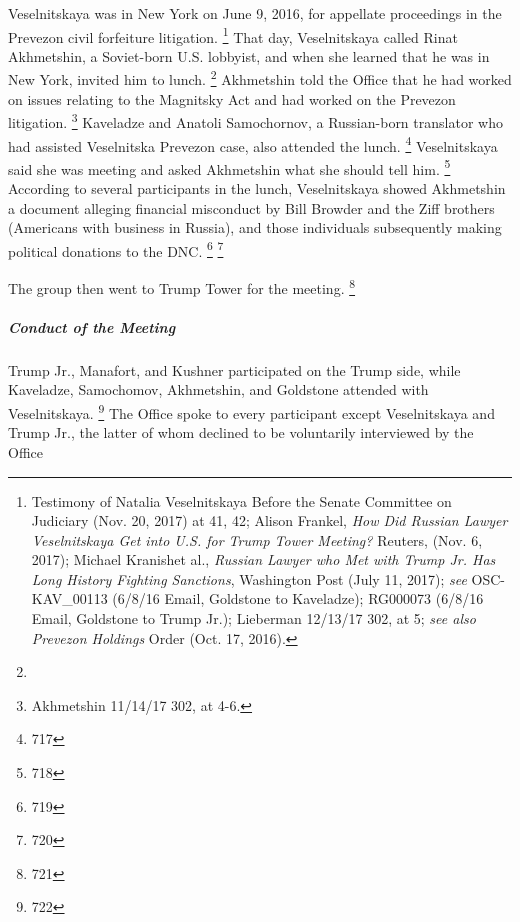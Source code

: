 Veselnitskaya was in New York on June 9, 2016, for appellate proceedings in the Prevezon civil forfeiture litigation.%
\footnote{Testimony of Natalia Veselnitskaya Before the Senate Committee on Judiciary (Nov. 20, 2017) at 41, 42; 
Alison Frankel, \textit{How Did Russian Lawyer Veselnitskaya Get into U.S. for Trump Tower Meeting?} Reuters, (Nov. 6, 2017); 
Michael Kranishet al., \textit{Russian Lawyer who Met with Trump Jr. Has Long History Fighting Sanctions}, Washington Post (July 11, 2017); 
\textit{see} OSC-KAV\_00113 (6/8/16 Email, Goldstone to Kaveladze); 
RG000073 (6/8/16 Email, Goldstone to Trump Jr.); 
Lieberman 12/13/17 302, at 5; 
\textit{see also Prevezon Holdings} Order (Oct. 17, 2016).}
That day, Veselnitskaya called Rinat Akhmetshin, a Soviet-born U.S. lobbyist,
and when she learned that he was in New York, invited him to lunch.%
\footnote{}
Akhmetshin told the Office that he had worked on issues relating to the Magnitsky Act and had worked on the Prevezon litigation.%
\footnote{Akhmetshin 11/14/17 302, at 4-6. }
Kaveladze and Anatoli Samochornov, a Russian-born translator who had assisted Veselnitska Prevezon case, also attended the lunch.%
\footnote{717}
 Veselnitskaya said she was meeting  and asked Akhmetshin what she should tell him.%
\footnote{718}
According to several participants in the lunch, Veselnitskaya showed Akhmetshin a document alleging financial misconduct by Bill Browder and the Ziff brothers (Americans with business in Russia), and those individuals subsequently making political donations to the DNC.%
\footnote{719}
\footnote{720}

The group then went to Trump Tower for the meeting.%
\footnote{721}

\subparagraph{Conduct of the Meeting}

Trump Jr., Manafort, and Kushner participated on the Trump side, while Kaveladze, Samochomov, Akhmetshin, and Goldstone attended with Veselnitskaya.%
\footnote{722}
The Office spoke to every participant except Veselnitskaya and Trump Jr., the latter of whom declined to be voluntarily interviewed by the Office

